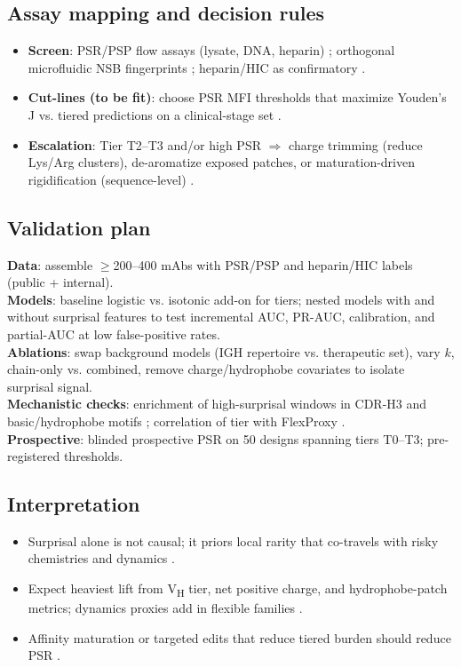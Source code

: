 \subsection*{Assay mapping and decision rules}
\begin{itemize}\setlength\itemsep{2pt}
\item \textbf{Screen}: PSR/PSP flow assays (lysate, DNA, heparin) \cite{Xu2013,Makowski2021}; orthogonal microfluidic NSB fingerprints \cite{Herling2023}; heparin/HIC as confirmatory \cite{Cunningham2021,Ausserwoger2023}.
\item \textbf{Cut-lines (to be fit)}: choose PSR MFI thresholds that maximize Youden’s J vs. tiered predictions on a clinical-stage set \cite{Makowski2021,Herling2023}.
\item \textbf{Escalation}: Tier T2–T3 and/or high PSR $\Rightarrow$ charge trimming (reduce Lys/Arg clusters), de-aromatize exposed patches, or maturation-driven rigidification (sequence-level) \cite{Shehata2019,Cunningham2021,Lecerf2023}.
\end{itemize}

\subsection*{Validation plan}
\textbf{Data}: assemble $\geq$200–400 mAbs with PSR/PSP and heparin/HIC labels (public + internal).\\
\textbf{Models}: baseline logistic vs. isotonic add-on for tiers; nested models with and without surprisal features to test incremental AUC, PR-AUC, calibration, and partial-AUC at low false-positive rates.\\
\textbf{Ablations}: swap background models (IGH repertoire vs. therapeutic set), vary $k$, chain-only vs. combined, remove charge/hydrophobe covariates to isolate surprisal signal.\\
\textbf{Mechanistic checks}: enrichment of high-surprisal windows in CDR-H3 and basic/hydrophobe motifs \cite{Boughter2020,Lecerf2023}; correlation of tier with FlexProxy \cite{FQ2020states,Jeliazkov2018}.\\
\textbf{Prospective}: blinded prospective PSR on 50 designs spanning tiers T0–T3; pre-registered thresholds.

\subsection*{Interpretation}
\begin{itemize}\setlength\itemsep{2pt}
\item Surprisal alone is not causal; it priors local rarity that co-travels with risky chemistries and dynamics \cite{Humphrey2020,Chen2024,Ausserwoger2023}.
\item Expect heaviest lift from V\textsubscript{H} tier, net positive charge, and hydrophobe-patch metrics; dynamics proxies add in flexible families \cite{Chen2024,Shehata2019,FQ2020states}.
\item Affinity maturation or targeted edits that reduce tiered burden should reduce PSR \cite{Shehata2019,Cunningham2021}.
\end{itemize}

